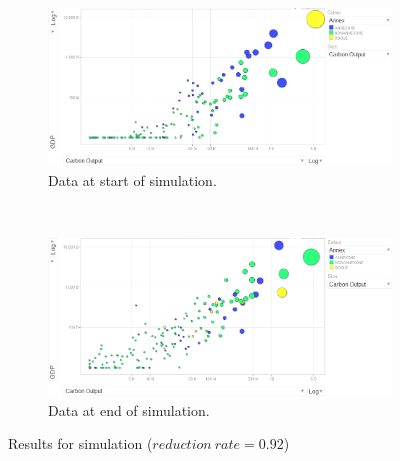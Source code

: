 \begin{figure}[H]
		\centering
        \begin{subfigure}[b]{\textwidth}
                \centering
                \includegraphics[width=\textwidth]{img/simulations/352-reduction-rate-before.png}
				\caption{Data at start of simulation.}
				\label{subfig:352-1}
        \end{subfigure}
        \\
        \begin{subfigure}[b]{\textwidth}
                \centering
                \includegraphics[width=\textwidth]{img/simulations/352-reduction-rate-after.png}
				\caption{Data at end of simulation.}
				\label{subfig:352-2}
        \end{subfigure}
        \caption{Results for simulation ($reduction~rate=0.92$)}\label{fig:352}
\end{figure}
